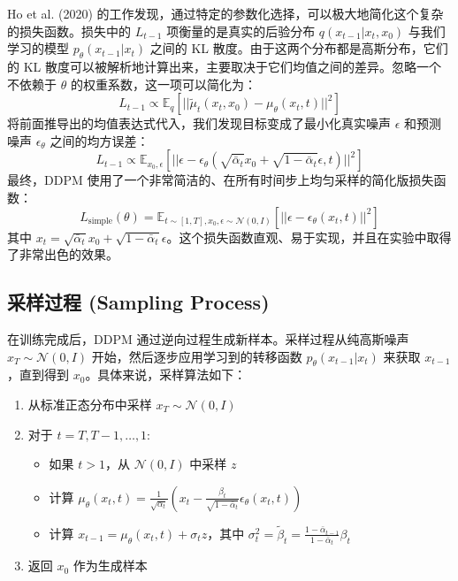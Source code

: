 \documentclass{ctexart}
\begin{document}
Ho et al. (2020) 的工作发现，通过特定的参数化选择，可以极大地简化这个复杂的损失函数。损失中的 $L_{t-1}$ 项衡量的是真实的后验分布 $q(x_{t-1}|x_t, x_0)$ 与我们学习的模型 $p_\theta(x_{t-1}|x_t)$ 之间的 KL 散度。由于这两个分布都是高斯分布，它们的 KL 散度可以被解析地计算出来，主要取决于它们均值之间的差异。忽略一个不依赖于 $\theta$ 的权重系数，这一项可以简化为：
$$ L_{t-1} \propto \mathbb{E}_{q} \left[ ||\tilde{\mu}_t(x_t, x_0) - \mu_\theta(x_t, t)||^2 \right] $$
将前面推导出的均值表达式代入，我们发现目标变成了最小化真实噪声 $\epsilon$ 和预测噪声 $\epsilon_\theta$ 之间的均方误差：
$$ L_{t-1} \propto \mathbb{E}_{x_0, \epsilon} \left[ ||\epsilon - \epsilon_\theta(\sqrt{\bar{\alpha}_t}x_0 + \sqrt{1-\bar{\alpha}_t}\epsilon, t)||^2 \right] $$
最终，DDPM 使用了一个非常简洁的、在所有时间步上均匀采样的简化版损失函数：
$$ L_{\text{simple}}(\theta) = \mathbb{E}_{t \sim [1,T], x_0, \epsilon \sim \mathcal{N}(0,I)} \left[ ||\epsilon - \epsilon_\theta(x_t, t)||^2 \right] $$
其中 $x_t = \sqrt{\bar{\alpha}_t}x_0 + \sqrt{1-\bar{\alpha}_t}\epsilon$。这个损失函数直观、易于实现，并且在实验中取得了非常出色的效果。

\subsection{采样过程 (Sampling Process)}

在训练完成后，DDPM 通过逆向过程生成新样本。采样过程从纯高斯噪声 $x_T \sim \mathcal{N}(0, I)$ 开始，然后逐步应用学习到的转移函数 $p_\theta(x_{t-1} | x_t)$ 来获取 $x_{t-1}$，直到得到 $x_0$。具体来说，采样算法如下：

\begin{enumerate}
    \item 从标准正态分布中采样 $x_T \sim \mathcal{N}(0, I)$
    \item 对于 $t = T, T-1, \dots, 1$:
    \begin{itemize}
        \item 如果 $t > 1$，从 $\mathcal{N}(0, I)$ 中采样 $z$
        \item 计算 $\mu_\theta(x_t, t) = \frac{1}{\sqrt{\alpha_t}}\left(x_t - \frac{\beta_t}{\sqrt{1-\bar{\alpha}_t}}\epsilon_\theta(x_t, t)\right)$
        \item 计算 $x_{t-1} = \mu_\theta(x_t, t) + \sigma_t z$，其中 $\sigma_t^2 = \tilde{\beta}_t = \frac{1-\bar{\alpha}_{t-1}}{1-\bar{\alpha}_t}\beta_t$
    \end{itemize}
    \item 返回 $x_0$ 作为生成样本
\end{enumerate}
\end{document}
